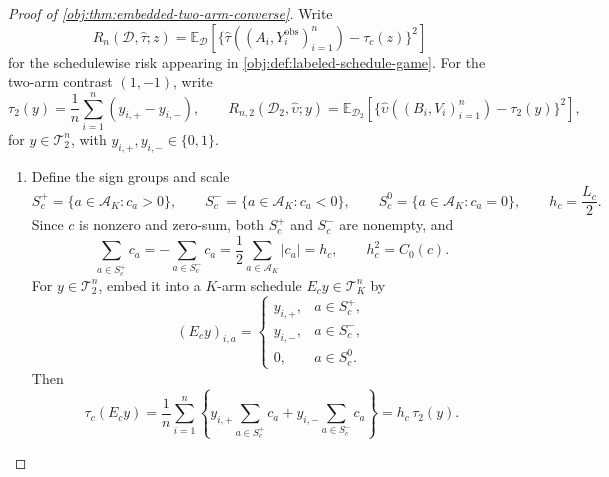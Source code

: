 \begin{proof}[Proof of \cref{obj:thm:embedded-two-arm-converse}]
Write
\[
R_n(\mathcal D,\widehat\tau;z)
=
\mathbb E_{\mathcal D}\!\left[
\{\widehat\tau((A_i,Y_i^{\mathrm{obs}})_{i=1}^n)-\tau_c(z)\}^2
\right]
\]
for the schedulewise risk appearing in \cref{obj:def:labeled-schedule-game}. For the two-arm contrast \((1,-1)\), write
\[
\tau_2(y)=\frac1n\sum_{i=1}^n(y_{i,+}-y_{i,-}),
\qquad
R_{n,2}(\mathcal D_2,\widehat\upsilon;y)
=
\mathbb E_{\mathcal D_2}\!\left[
\{\widehat\upsilon((B_i,V_i)_{i=1}^n)-\tau_2(y)\}^2
\right],
\]
for \(y\in\mathcal T_2^n\), with \(y_{i,+},y_{i,-}\in\{0,1\}\).

\begin{enumerate}
\item Define the sign groups and scale
\[
S_c^+=\{a\in\mathcal A_K:c_a>0\},\qquad
S_c^-=\{a\in\mathcal A_K:c_a<0\},\qquad
S_c^0=\{a\in\mathcal A_K:c_a=0\},
\qquad
h_c=\frac{L_c}{2}.
\]
Since \(c\) is nonzero and zero-sum, both \(S_c^+\) and \(S_c^-\) are nonempty, and
\[
\sum_{a\in S_c^+}c_a
=
-\sum_{a\in S_c^-}c_a
=
\frac12\sum_{a\in\mathcal A_K}|c_a|
=
h_c,
\qquad
h_c^2=C_0(c).
\]
For \(y\in\mathcal T_2^n\), embed it into a \(K\)-arm schedule \(E_cy\in\mathcal T_K^n\) by
\[
(E_cy)_{i,a}
=
\begin{cases}
y_{i,+},&a\in S_c^+,\\
y_{i,-},&a\in S_c^-,\\
0,&a\in S_c^0.
\end{cases}
\]
Then
\[
\tau_c(E_cy)
=
\frac1n\sum_{i=1}^n
\left\{
y_{i,+}\sum_{a\in S_c^+}c_a+
y_{i,-}\sum_{a\in S_c^-}c_a
\right\}
=
h_c\,\tau_2(y).
\]


\end{enumerate}
\end{proof}

